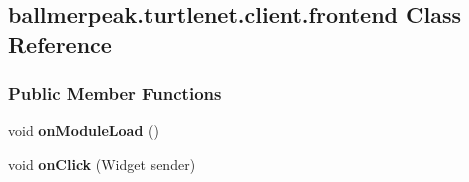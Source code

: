 \hypertarget{classballmerpeak_1_1turtlenet_1_1client_1_1frontend}{\subsection{ballmerpeak.\-turtlenet.\-client.\-frontend Class Reference}
\label{classballmerpeak_1_1turtlenet_1_1client_1_1frontend}
}
\subsubsection*{Public Member Functions}
\begin{DoxyCompactItemize}
\item 
\hypertarget{classballmerpeak_1_1turtlenet_1_1client_1_1frontend_adce2a675f44267e0ab469bcb30095a39}{void {\bfseries on\-Module\-Load} ()}\label{classballmerpeak_1_1turtlenet_1_1client_1_1frontend_adce2a675f44267e0ab469bcb30095a39}

\item 
\hypertarget{classballmerpeak_1_1turtlenet_1_1client_1_1frontend_a32d8529c726125bae2ac35635712d067}{void {\bfseries on\-Click} (Widget sender)}\label{classballmerpeak_1_1turtlenet_1_1client_1_1frontend_a32d8529c726125bae2ac35635712d067}

\end{DoxyCompactItemize}
